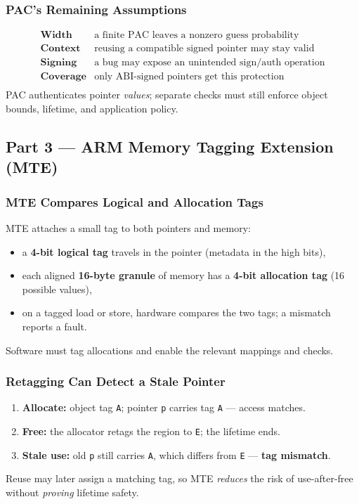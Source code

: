 \documentclass[hidelinks]{article}
\begin{document}
\subsubsection{PAC's Remaining Assumptions}

\[
\begin{array}{ll}
\textbf{Width}    & \text{a finite PAC leaves a nonzero guess probability}\\
\textbf{Context}  & \text{reusing a compatible signed pointer may stay valid}\\
\textbf{Signing}  & \text{a bug may expose an unintended sign/auth operation}\\
\textbf{Coverage} & \text{only ABI-signed pointers get this protection}\\
\end{array}
\]
PAC authenticates pointer \emph{values}; separate checks must still enforce object bounds, lifetime, and application policy.

\subsection{Part 3 --- ARM Memory Tagging Extension (MTE)}

\subsubsection{MTE Compares Logical and Allocation Tags}

MTE attaches a small tag to both pointers and memory:
\begin{itemize}
    \item a \textbf{4-bit logical tag} travels in the pointer (metadata in the high bits),
    \item each aligned \textbf{16-byte granule} of memory has a \textbf{4-bit allocation tag} (16 possible values),
    \item on a tagged load or store, hardware compares the two tags; a mismatch reports a fault.
\end{itemize}
Software must tag allocations and enable the relevant mappings and checks.

\subsubsection{Retagging Can Detect a Stale Pointer}

\begin{enumerate}
    \item \textbf{Allocate:} object tag \texttt{A}; pointer \texttt{p} carries tag \texttt{A} --- access matches.
    \item \textbf{Free:} the allocator retags the region to \texttt{E}; the lifetime ends.
    \item \textbf{Stale use:} old \texttt{p} still carries \texttt{A}, which differs from \texttt{E} --- \textbf{tag mismatch}.
\end{enumerate}
Reuse may later assign a matching tag, so MTE \emph{reduces} the risk of use-after-free without \emph{proving} lifetime safety.
\end{document}
